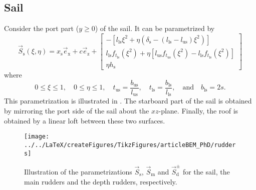 \subsection{Sail}
Consider the port part ($y\geq 0$) of the sail. It can be parametrized by
\begin{equation}\label{Eq3:sail}
	\vec{S}_{\mathrm{s}}(\xi,\eta) = x_{\mathrm{s}}\vec{e}_{\mathrm{x}} + c\vec{e}_{\mathrm{z}} + \begin{bmatrix}
	-\left[l_{\mathrm{ls}} \xi^2+\eta\left(\delta_{\mathrm{s}}-(l_{\mathrm{ls}}-l_{\mathrm{us}})\xi^2\right)\right]\\
	l_{\mathrm{ls}}f_{t_{\mathrm{ls}}}(\xi^2) + \eta\left[l_{\mathrm{us}}f_{t_{\mathrm{us}}}(\xi^2)-l_{\mathrm{ls}}f_{t_{\mathrm{ls}}}(\xi^2)\right]\\
	\eta h_{\mathrm{s}}
	\end{bmatrix}
\end{equation}
where
\begin{equation*}
	0\leq \xi\leq 1,\quad 0\leq \eta \leq 1,\quad t_{\mathrm{us}}=\frac{b_{\mathrm{us}}}{l_{\mathrm{us}}},\quad t_{\mathrm{ls}}=\frac{b_{\mathrm{ls}}}{l_{\mathrm{ls}}},\quad\text{and}\quad b_{\mathrm{ls}}=2s.
\end{equation*}
This parametrization is illustrated in . The starboard part of the sail is obtained by mirroring the port side of the sail about the $xz$-plane. Finally, the roof is obtained by a linear loft between these two surfaces.
\begin{figure}
	\centering
	\texttt{[image: ../../LaTeX/createFigures/TikzFigures/articleBEM\_PhD/rudders]}
	\caption{Illustration of the parametrizations $\vec{S}_{\mathrm{s}}$, $\vec{S}_{\mathrm{m}}$ and $\vec{S}_{\mathrm{d}}^\pm$ for the sail, the main rudders and the depth rudders, respectively.}
	\label{Fig3:rudders}
\end{figure}

